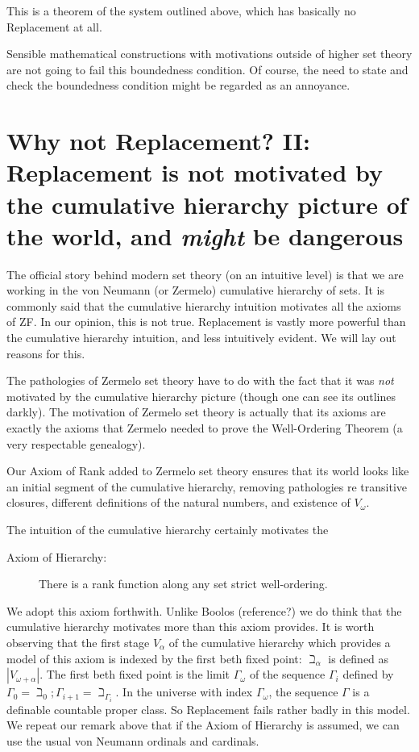 \documentclass[12pt]{article}
\begin{document}
This is a theorem of the system outlined above, which has basically no Replacement at all.

Sensible mathematical constructions with motivations outside of higher set theory are not going to fail this boundedness condition.  Of course, the need to state and check the boundedness condition might be regarded as an annoyance.

\section{Why not Replacement? II:  Replacement is not motivated by the cumulative hierarchy picture of the world, and {\em might\/} be dangerous}

The official story behind modern set theory (on an intuitive level) is that we are working in the von Neumann (or Zermelo) cumulative hierarchy of sets.  It is commonly said that the cumulative hierarchy intuition motivates all the axioms of ZF.  In our opinion, this is not true.  Replacement is vastly more powerful than the cumulative hierarchy intuition, and less intuitively evident.  We will lay out reasons for this.

The pathologies of Zermelo set theory have to do with the fact that it was {\em not\/} motivated by the cumulative hierarchy picture (though one can see its outlines darkly).  The motivation of Zermelo set theory is actually that its axioms are exactly the axioms that Zermelo needed to prove the Well-Ordering Theorem (a very respectable genealogy).

Our Axiom of Rank added to Zermelo set theory ensures that its world looks like an initial segment of the cumulative hierarchy, removing pathologies re transitive closures, different definitions of the natural numbers, and existence of $V_{\omega}$.

The intuition of the cumulative hierarchy certainly motivates the

\begin{description}

\item[Axiom of Hierarchy:]  There is a rank function along any set strict well-ordering.

\end{description}

We adopt this axiom forthwith.  Unlike Boolos (reference?) we do think that the cumulative hierarchy motivates more than this axiom provides.  It is worth observing that the first
stage $V_{\alpha}$ of the cumulative hierarchy which provides a model of this axiom is indexed by the first beth fixed point:  $\beth_{\alpha}$ is defined as $|V_{\omega+\alpha}|$.
The first beth fixed point is the limit $\Gamma_{\omega}$ of the sequence $\Gamma_i$ defined by $\Gamma_0=\beth_0;  \Gamma_{i+1} = \beth_{\Gamma_i}$.  In the universe with index
$\Gamma_{\omega}$, the sequence $\Gamma$ is a definable countable proper class.  So Replacement fails rather badly in this model.  We repeat our remark above that if the Axiom of Hierarchy is assumed, we can use the usual von Neumann ordinals and cardinals.
\end{document}

